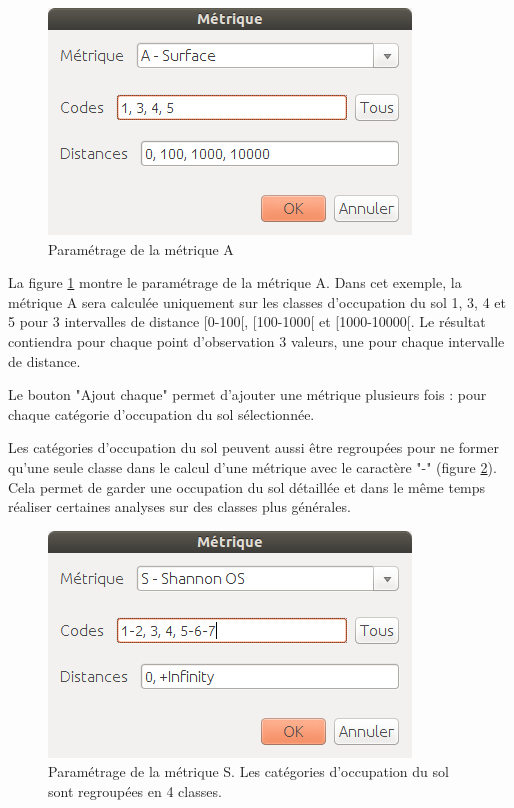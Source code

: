 \documentclass{report}
\begin{document}
\begin{figure}[H]
	\includegraphics[scale=0.5]{img/metric_param-fr.png} 
	\caption{Paramétrage de la métrique A}
	\label{metric_param_dlg}
\end{figure}

La figure \ref{metric_param_dlg} montre le paramétrage de la métrique A. Dans cet exemple, la métrique A sera calculée uniquement sur les classes d'occupation du sol 1, 3, 4 et 5 pour 3 intervalles de distance [0-100[, [100-1000[ et [1000-10000[. Le résultat contiendra pour chaque point d'observation 3 valeurs, une pour chaque intervalle de distance.

Le bouton "Ajout chaque" permet d'ajouter une métrique plusieurs fois : pour chaque catégorie d'occupation du sol sélectionnée.

Les catégories d'occupation du sol peuvent aussi être regroupées pour ne former qu'une seule classe dans le calcul d'une métrique avec le caractère "-" (figure \ref{metric_param_group_dlg}). Cela permet de garder une occupation du sol détaillée et dans le même temps réaliser certaines analyses sur des classes plus générales.

\begin{figure}[H]
	\includegraphics[scale=0.5]{img/metric_param_group-fr.png} 
	\caption{Paramétrage de la métrique S. Les catégories d'occupation du sol sont regroupées en 4 classes.}
	\label{metric_param_group_dlg}
\end{figure}
\end{document}
